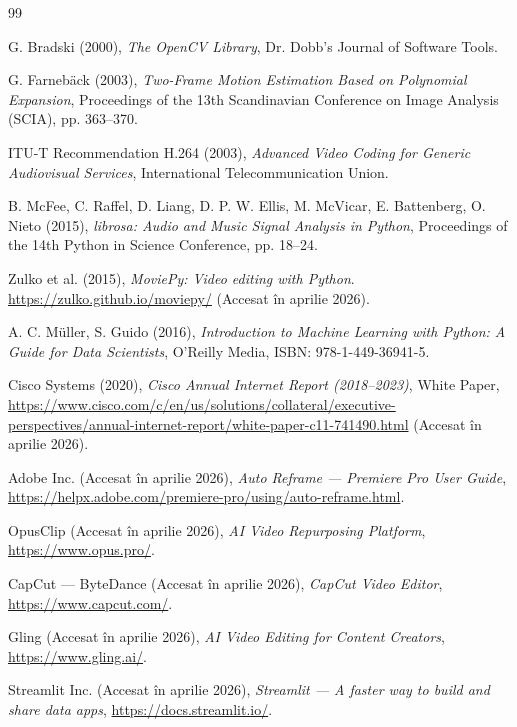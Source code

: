 \documentclass[12pt,a4paper]{article}
\begin{document}
\newpage
\begin{thebibliography}{99}

G. Bradski (2000), \emph{The OpenCV Library}, Dr. Dobb's Journal of Software Tools.

G. Farneb{\"a}ck (2003), \emph{Two-Frame Motion Estimation Based on Polynomial Expansion}, Proceedings of the 13th Scandinavian Conference on Image Analysis (SCIA), pp. 363--370.

ITU-T Recommendation H.264 (2003), \emph{Advanced Video Coding for Generic Audiovisual Services}, International Telecommunication Union.

B. McFee, C. Raffel, D. Liang, D. P. W. Ellis, M. McVicar, E. Battenberg, O. Nieto (2015), \emph{librosa: Audio and Music Signal Analysis in Python}, Proceedings of the 14th Python in Science Conference, pp. 18--24.

Zulko et al. (2015), \emph{MoviePy: Video editing with Python}. \url{https://zulko.github.io/moviepy/} (Accesat \^{i}n aprilie 2026).

A. C. M{\"u}ller, S. Guido (2016), \emph{Introduction to Machine Learning with Python: A Guide for Data Scientists}, O'Reilly Media, ISBN: 978-1-449-36941-5.

Cisco Systems (2020), \emph{Cisco Annual Internet Report (2018--2023)}, White Paper, \url{https://www.cisco.com/c/en/us/solutions/collateral/executive-perspectives/annual-internet-report/white-paper-c11-741490.html} (Accesat \^{i}n aprilie 2026).

Adobe Inc. (Accesat \^{i}n aprilie 2026), \emph{Auto Reframe --- Premiere Pro User Guide}, \url{https://helpx.adobe.com/premiere-pro/using/auto-reframe.html}.

OpusClip (Accesat \^{i}n aprilie 2026), \emph{AI Video Repurposing Platform}, \url{https://www.opus.pro/}.

CapCut --- ByteDance (Accesat \^{i}n aprilie 2026), \emph{CapCut Video Editor}, \url{https://www.capcut.com/}.

Gling (Accesat \^{i}n aprilie 2026), \emph{AI Video Editing for Content Creators}, \url{https://www.gling.ai/}.

Streamlit Inc. (Accesat \^{i}n aprilie 2026), \emph{Streamlit --- A faster way to build and share data apps}, \url{https://docs.streamlit.io/}.

\end{thebibliography}
\end{document}

